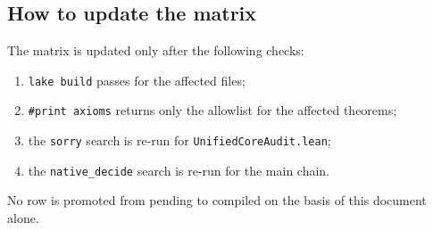\subsection{How to update the matrix}

The matrix is updated only after the following checks:
\begin{enumerate}[leftmargin=*]
\item \texttt{lake build} passes for the affected files;
\item \texttt{\#print axioms} returns only the allowlist for the
  affected theorems;
\item the \texttt{sorry} search is re-run for
  \texttt{UnifiedCoreAudit.lean};
\item the \texttt{native\_decide} search is re-run for the main chain.
\end{enumerate}
No row is promoted from pending to compiled on the basis of this
document alone.

\endgroup
